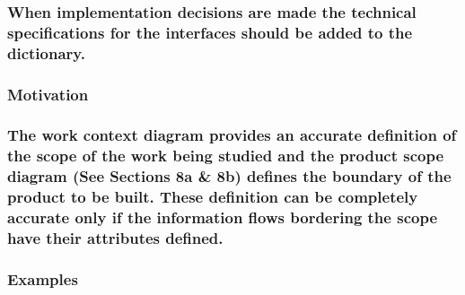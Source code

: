 \documentclass[
]{article}
\begin{document}
\hypertarget{when-implementation-decisions-are-made-the-technical-specifications-for-the-interfaces-should-be-added-to-the-dictionary.}{%
\subsubsection{When implementation decisions are made the technical
specifications for the interfaces should be added to the
dictionary.}\label{when-implementation-decisions-are-made-the-technical-specifications-for-the-interfaces-should-be-added-to-the-dictionary.}}

\hypertarget{motivation-27}{%
\subsubsection{Motivation}\label{motivation-27}}

\hypertarget{the-work-context-diagram-provides-an-accurate-definition-of-the-scope-of-the-work-being-studied-and-the-product-scope-diagram-see-sections-8a-8b-defines-the-boundary-of-the-product-to-be-built.-these-definition-can-be-completely-accurate-only-if-the-information-flows-bordering-the-scope-have-their-attributes-defined.}{%
\subsubsection{\texorpdfstring{The work context diagram provides an
accurate definition of the scope of the work being studied and the
product scope diagram (See Sections 8a \& 8b) defines the boundary of
the product to be built. These definition can be completely accurate
only if the information flows bordering the scope have their attributes
defined.
}{The work context diagram provides an accurate definition of the scope of the work being studied and the product scope diagram (See Sections 8a \& 8b) defines the boundary of the product to be built. These definition can be completely accurate only if the information flows bordering the scope have their attributes defined. }}\label{the-work-context-diagram-provides-an-accurate-definition-of-the-scope-of-the-work-being-studied-and-the-product-scope-diagram-see-sections-8a-8b-defines-the-boundary-of-the-product-to-be-built.-these-definition-can-be-completely-accurate-only-if-the-information-flows-bordering-the-scope-have-their-attributes-defined.}}

\hypertarget{examples-13}{%
\subsubsection{Examples}\label{examples-13}}
\end{document}
